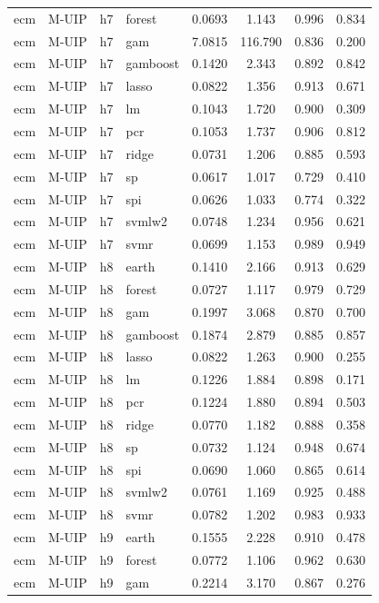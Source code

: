 \begin{ThreePartTable}
\begin{longtable}[t]{llclcccc}
ecm & M-UIP & h7 & forest & 0.0693 & 1.143 & 0.996 & 0.834\\
ecm & M-UIP & h7 & gam & 7.0815 & 116.790 & 0.836 & 0.200\\
ecm & M-UIP & h7 & gamboost & 0.1420 & 2.343 & 0.892 & 0.842\\
ecm & M-UIP & h7 & lasso & 0.0822 & 1.356 & 0.913 & 0.671\\
ecm & M-UIP & h7 & lm & 0.1043 & 1.720 & 0.900 & 0.309\\
ecm & M-UIP & h7 & pcr & 0.1053 & 1.737 & 0.906 & 0.812\\
ecm & M-UIP & h7 & ridge & 0.0731 & 1.206 & 0.885 & 0.593\\
ecm & M-UIP & h7 & sp & 0.0617 & 1.017 & 0.729 & 0.410\\
ecm & M-UIP & h7 & spi & 0.0626 & 1.033 & 0.774 & 0.322\\
ecm & M-UIP & h7 & svmlw2 & 0.0748 & 1.234 & 0.956 & 0.621\\
ecm & M-UIP & h7 & svmr & 0.0699 & 1.153 & 0.989 & 0.949\\
\addlinespace
ecm & M-UIP & h8 & earth & 0.1410 & 2.166 & 0.913 & 0.629\\
ecm & M-UIP & h8 & forest & 0.0727 & 1.117 & 0.979 & 0.729\\
ecm & M-UIP & h8 & gam & 0.1997 & 3.068 & 0.870 & 0.700\\
ecm & M-UIP & h8 & gamboost & 0.1874 & 2.879 & 0.885 & 0.857\\
ecm & M-UIP & h8 & lasso & 0.0822 & 1.263 & 0.900 & 0.255\\
ecm & M-UIP & h8 & lm & 0.1226 & 1.884 & 0.898 & 0.171\\
ecm & M-UIP & h8 & pcr & 0.1224 & 1.880 & 0.894 & 0.503\\
ecm & M-UIP & h8 & ridge & 0.0770 & 1.182 & 0.888 & 0.358\\
ecm & M-UIP & h8 & sp & 0.0732 & 1.124 & 0.948 & 0.674\\
ecm & M-UIP & h8 & spi & 0.0690 & 1.060 & 0.865 & 0.614\\
ecm & M-UIP & h8 & svmlw2 & 0.0761 & 1.169 & 0.925 & 0.488\\
ecm & M-UIP & h8 & svmr & 0.0782 & 1.202 & 0.983 & 0.933\\
\addlinespace
ecm & M-UIP & h9 & earth & 0.1555 & 2.228 & 0.910 & 0.478\\
ecm & M-UIP & h9 & forest & 0.0772 & 1.106 & 0.962 & 0.630\\
ecm & M-UIP & h9 & gam & 0.2214 & 3.170 & 0.867 & 0.276\\

\end{longtable}
\end{ThreePartTable}
